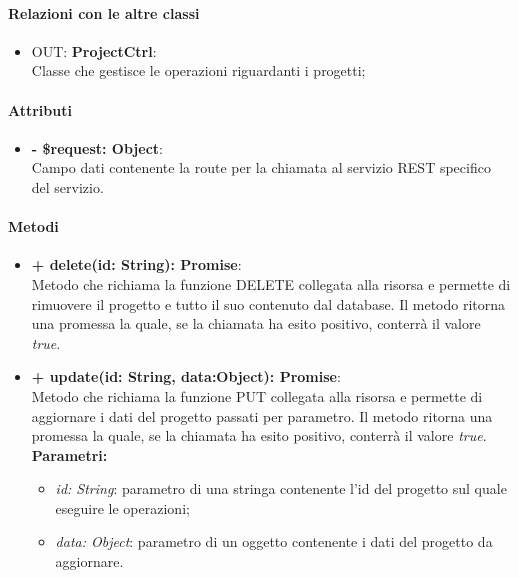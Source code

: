 		\paragraph{Relazioni con le altre classi}
		\begin{itemize}
			\item OUT: \textbf{ProjectCtrl}:\\
			Classe che gestisce le operazioni riguardanti i progetti;
		\end{itemize}
		
		\paragraph{Attributi}
		\begin{itemize}
			\item \textbf{- \$request: Object}:\\
			Campo dati contenente la route per la chiamata al servizio REST specifico del servizio.
		\end{itemize}	
		
		\paragraph{Metodi}
		\begin{itemize}
			\item \textbf{+ delete(id: String): Promise}:\\
			Metodo che richiama la funzione DELETE collegata alla risorsa e permette di rimuovere il progetto e tutto il suo contenuto dal database. Il metodo ritorna una promessa la quale, se la chiamata ha esito positivo, conterrà il valore \textit{true}.\\
			\item \textbf{+ update(id: String, data:Object): Promise}:\\
			Metodo che richiama la funzione PUT collegata alla risorsa e permette di aggiornare i dati del progetto passati per parametro. Il metodo ritorna una promessa la quale, se la chiamata ha esito positivo, conterrà il valore \textit{true}.\\
			\textbf{Parametri:}\\
			\begin{itemize}
				\item \textit{id: String}: parametro di una stringa contenente l'id del progetto sul quale eseguire le operazioni;
				\item \textit{data: Object}: parametro di un oggetto contenente i dati del progetto da aggiornare.
			\end{itemize}
		\end{itemize}
\newpage


